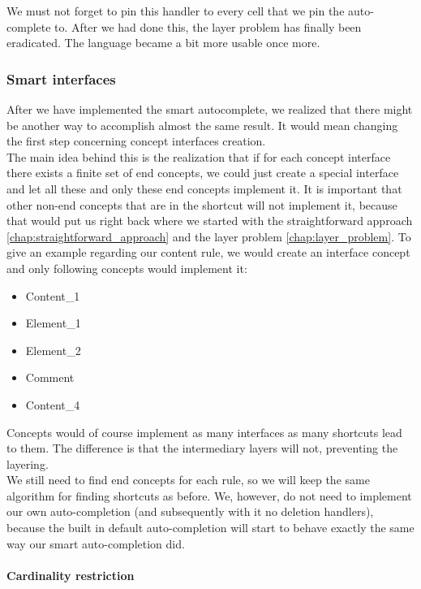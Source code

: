We must not forget to pin this handler to every cell that we pin the auto-complete to. After we had done this, the layer problem has finally been eradicated. The language became a bit more usable once more.

\subsubsection{Smart interfaces}

After we have implemented the smart autocomplete, we realized that there might be another way to accomplish almost the same result. It would mean changing the first step concerning concept interfaces creation.
\\

The main idea behind this is the realization that if for each concept interface there exists a finite set of end concepts, we could just create a special interface and let all these and only these end concepts implement it. It is important that other non-end concepts that are in the shortcut will not implement it, because that would put us right back where we started with the straightforward approach \ref{chap:straightforward_approach} and the layer problem \ref{chap:layer_problem}. To give an example regarding our content rule, we would create an  interface concept and only following concepts would implement it:

\begin{itemize}
	\setlength\itemsep{0pt}
	\item Content{\_}1
	\item Element{\_}1
	\item Element{\_}2
	\item Comment
	\item Content{\_}4
\end{itemize}

Concepts would of course implement as many interfaces as many shortcuts lead to them. The difference is that the intermediary layers will not, preventing the layering.
\\

We still need to find end concepts for each rule, so we will keep the same algorithm for finding shortcuts as before. We, however, do not need to implement our own auto-completion (and subsequently with it no deletion handlers), because the built in default auto-completion will start to behave exactly the same way our smart auto-completion did.

\paragraph{Cardinality restriction}

